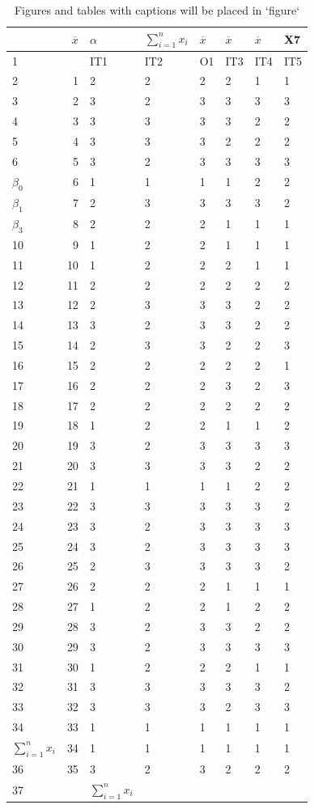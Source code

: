 \documentclass[10pt,]{krantz}
\theoremstyle{definition}
\theoremstyle{definition}
\theoremstyle{definition}
\theoremstyle{definition}
\theoremstyle{remark}
\begin{document}
\begin{longtable}[t]{lrllllll}
\caption{\label{tab:unnamed-chunk-3}Figures and tables with captions will be placed in `figure`}\\
\toprule
  & $\overline{x}$ & $\alpha$ & $\sum^{n}_{i=1}{x_i}$ & $\overline{x}$ & $\overline{x}$ & $\overline{x}$ & X7\\
\midrule
1 &  & IT1 & IT2 & O1 & IT3 & IT4 & IT5\\
2 & 1 & 2 & 2 & 2 & 2 & 1 & 1\\
3 & 2 & 3 & 2 & 3 & 3 & 3 & 3\\
4 & 3 & 3 & 3 & 3 & 3 & 2 & 2\\
5 & 4 & 3 & 3 & 3 & 2 & 2 & 2\\
6 & 5 & 3 & 2 & 3 & 3 & 3 & 3\\
$\beta_0$ & 6 & 1 & 1 & 1 & 1 & 2 & 2\\
$\beta_1$ & 7 & 2 & 3 & 3 & 3 & 3 & 2\\
$\beta_3$ & 8 & 2 & 2 & 2 & 1 & 1 & 1\\
10 & 9 & 1 & 2 & 2 & 1 & 1 & 1\\
11 & 10 & 1 & 2 & 2 & 2 & 1 & 1\\
12 & 11 & 2 & 2 & 2 & 2 & 2 & 2\\
13 & 12 & 2 & 3 & 3 & 3 & 2 & 2\\
14 & 13 & 3 & 2 & 3 & 3 & 2 & 2\\
15 & 14 & 2 & 3 & 3 & 2 & 2 & 3\\
16 & 15 & 2 & 2 & 2 & 2 & 2 & 1\\
17 & 16 & 2 & 2 & 2 & 3 & 2 & 3\\
18 & 17 & 2 & 2 & 2 & 2 & 2 & 2\\
19 & 18 & 1 & 2 & 2 & 1 & 1 & 2\\
20 & 19 & 3 & 2 & 3 & 3 & 3 & 3\\
21 & 20 & 3 & 3 & 3 & 3 & 2 & 2\\
22 & 21 & 1 & 1 & 1 & 1 & 2 & 2\\
23 & 22 & 3 & 3 & 3 & 3 & 3 & 2\\
24 & 23 & 3 & 2 & 3 & 3 & 3 & 3\\
25 & 24 & 3 & 2 & 3 & 3 & 3 & 3\\
26 & 25 & 2 & 3 & 3 & 3 & 3 & 2\\
27 & 26 & 2 & 2 & 2 & 1 & 1 & 1\\
28 & 27 & 1 & 2 & 2 & 1 & 2 & 2\\
29 & 28 & 3 & 2 & 3 & 3 & 2 & 2\\
30 & 29 & 3 & 2 & 3 & 3 & 3 & 3\\
31 & 30 & 1 & 2 & 2 & 2 & 1 & 1\\
32 & 31 & 3 & 3 & 3 & 3 & 3 & 2\\
33 & 32 & 3 & 3 & 3 & 2 & 3 & 3\\
34 & 33 & 1 & 1 & 1 & 1 & 1 & 1\\
$\sum^{n}_{i=1}{x_i}$ & 34 & 1 & 1 & 1 & 1 & 1 & 1\\
36 & 35 & 3 & 2 & 3 & 2 & 2 & 2\\
37 &  & $\sum_{i=1}^nx_i$ &  &  &  &  & \\
\bottomrule
\end{longtable}
\end{document}
